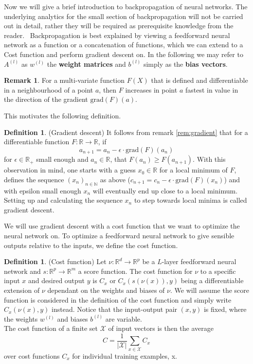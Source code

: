 \documentclass{article}
\theoremstyle{definition}
\newtheorem{definition}[theorem]{Definition}
\newtheorem{remark}[theorem]{Remark}
\begin{document}
Now we will give a brief introduction to backpropagation of neural networks. The underlying analytics for the small section of backpropagation will not be carried out in detail, rather they will be required as prerequisite knowledge from the reader. \
Backpropagation is best explained by viewing a feedforward neural network as a function or a concatenation of functions, which we can extend to a Cost function and perform gradient descent on.
In the following we may refer to $A^{(l)}$ as $w^{(l)}$ the \textbf{weight matrices} and $b^{(l)}$ simply as the \textbf{bias vectors}.

\begin{remark}
For a multi-variate function $F(X)$ that is defined and differentiable in a neighbourhood of a point $a$, then $F$ increases in point $a$ fastest in value in the direction of the gradient $\text{grad}(F)(a)$.
\end{remark}\label{rem:gradient}
This motivates the following definition.

\begin{definition}(Gradient descent)
It follows from remark \ref{rem:gradient} that for a differentiable function $F: \mathbb{R} \to \mathbb{R}$, if 
$$a_{n+1}=a_{n}-\epsilon \cdot \text{grad}(F)(a_{n})$$
for $\epsilon \in \mathbb{R}_{+}$ small enough and $a_{n} \in \mathbb{R}$, that $F(a_{n}) \geq F(a_{n+1})$. With this observation in mind, one starts with a guess $x_{0} \in \mathbb{R}$ for a local minimum of $F$, defines the sequence $(x_{n})_{n\in\mathbb{N}}$ as above ($c_{n+1}=c_{n}-\epsilon \cdot \text{grad}(F)(x_{n})$) and with epsilon small enough $x_{n}$ will eventually end up close to a local minimum. Setting up and calculating the sequence $x_{n}$ to step towards local minima is called gradient descent.
\end{definition}

We will use gradient descent with a cost function that we want to optimize the neural network on. To optimize a feedforward neural network to give sensible outputs relative to the inputs, we define the cost function.

\begin{definition}(Cost function)
\label{def:cost_fct}
Let $\nu : \mathbb{R}^{d} \to \mathbb{R}^{p}$ be a $L$-layer feedforward neural network and $s : \mathbb{R}^{p} \to \mathbb{R}^{m}$ a score function. The cost function for $\nu$ to a specific input $x$ and desired output $y$ is $C_{x}$ or $C_{x}(s(\nu(x)), y)$ being a differentiable extension of $\nu$ dependant on the weights and biases of $\nu$. We will assume the score function is considered in the definition of the cost function and simply write $C_{x}(\nu(x), y)$ instead. Notice that the input-output pair $(x, y)$ is fixed, where the weights $w^{(l)}$ and biases $b^{(l)}$ are variable. \\
The cost function of a finite set $\mathcal{X}$ of input vectors is then the average $$C=\frac{1}{|\mathcal{X}|}\sum_{x \in \mathcal{X}}C_{x}$$
over cost functions $C_{x}$ for individual training examples, x.
\end{definition}
\end{document}
